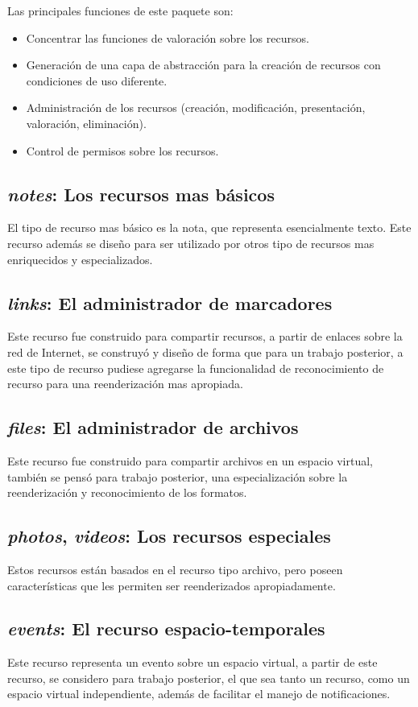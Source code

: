 Las principales funciones de este paquete son:

\begin{itemize}
\item Concentrar las funciones de valoración sobre los recursos.
\item Generación de una capa de abstracción para la creación de recursos con
condiciones de uso diferente.
\item Administración de los recursos (creación, modificación, presentación,
valoración, eliminación).
\item Control de permisos sobre los recursos.
\end{itemize}

\subsection{\emph{notes}: Los recursos mas básicos}
El tipo de recurso mas básico es la nota, que representa esencialmente texto.
Este recurso además se diseño para ser utilizado por otros tipo de recursos mas
enriquecidos y especializados.

\subsection{\emph{links}: El administrador de marcadores}
Este recurso fue construido para compartir recursos, a partir de enlaces sobre
la red de Internet, se construyó y diseño de forma que para un trabajo
posterior, a este tipo de recurso pudiese agregarse la funcionalidad de
reconocimiento de recurso para una reenderización mas apropiada.

\subsection{\emph{files}: El administrador de archivos}
Este recurso fue construido para compartir archivos en un espacio virtual,
también se pensó para trabajo posterior, una especialización sobre la
reenderización y reconocimiento de los formatos.

\subsection{\emph{photos}, \emph{videos}: Los recursos especiales}
Estos recursos están basados en el recurso tipo archivo, pero poseen
características que les permiten ser reenderizados apropiadamente.

\subsection{\emph{events}: El recurso espacio-temporales}
Este recurso representa un evento sobre un espacio virtual, a partir de este
recurso, se considero para trabajo posterior, el que sea tanto un recurso, como
un espacio virtual independiente, además de facilitar el manejo de
notificaciones.


